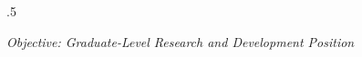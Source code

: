 \documentclass{res}
\begin{document}
 
\thispagestyle{empty} %
\vspace{0.3in}
\address{
{\tt hyogi@vt.edu} \\
Dept. of Computer Science, Virginia Tech\\
2202 Kraft Drive, Blacksburg, VA 24060\\
(540) 391-0202
}


\begin{resume}
\vspace{0.1in}
\moveleft.5\sectionwidth\centerline{
\it{Objective: Graduate-Level Research and Development Position}}

 
 
 






 
\end{resume}
\end{document}
